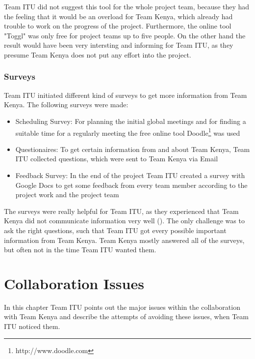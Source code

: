 Team ITU did not suggest this tool for the whole project team, because they had the feeling that it would be an overload for Team Kenya, which already had trouble to work on the progress of the project. Furthermore, the online tool "Toggl" was only free for project teams up to five people. On the other hand the result would have been very intersting and informing for Team ITU, as they presume Team Kenya does not put any effort into the project.

\subsubsection {Surveys}
Team ITU initiated different kind of surveys to get more information from Team Kenya. The following surveys were made:
	\begin{itemize}
		\item Scheduling Survey: For planning the initial global meetings and for finding a suitable time for a regularly meeting the free online tool Doodle\footnote{http://www.doodle.com} was used
		\item Questionaires: To get certain information from and about Team Kenya, Team ITU collected questions, which were sent to Team Kenya via Email 
		\item Feedback Survey: In the end of the project Team ITU created a survey with Google Docs to get some feedback from every team member according to the project work and the project team
	\end{itemize}
The surveys were really helpful for Team ITU, as they experienced that Team Kenya did not communicate information very well (). The only challenge was to ask the right questions, such that Team ITU got every possible important information from Team Kenya. Team Kenya mostly answered all of the surveys, but often not in the time Team ITU wanted them.



\section{Collaboration Issues}
In this chapter Team ITU points out the major issues within the collaboration with Team Kenya and describe the attempts of avoiding these issues, when Team ITU noticed them.


